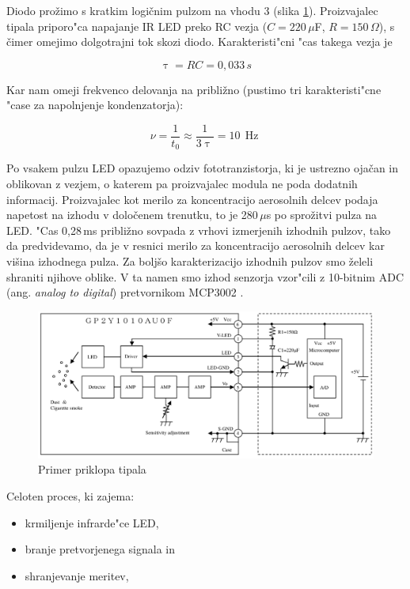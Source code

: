 \documentclass[11pt,a4paper]{article}
\DeclareMathOperator{\Hz}{Hz}
\begin{document}
Diodo prožimo s kratkim logičnim pulzom na vhodu 3 (slika \ref{integration-scheme}). 
Proizvajalec tipala priporo"ca \cite{sharp-gp2y1010au0f} napajanje IR LED preko RC vezja ($C=220\,\mu$F, $R=150\,\Omega$), s čimer omejimo dolgotrajni tok skozi diodo.  
Karakteristi"cni "cas takega vezja je

$$
\uptau = RC = 0,033\,s
$$

Kar nam omeji frekvenco delovanja na približno (pustimo tri karakteristi"cne "case za napolnjenje kondenzatorja):

$$
\nu = \frac{1}{t_0} \approx \frac{1}{3 \uptau} = 10\,\Hz
$$

Po vsakem pulzu LED opazujemo odziv fototranzistorja, ki je ustrezno ojačan in oblikovan z vezjem, o katerem pa proizvajalec modula ne poda dodatnih informacij. Proizvajalec kot merilo za koncentracijo aerosolnih delcev podaja napetost na izhodu v določenem trenutku, to je 280\,$\mu$s po sprožitvi pulza na LED.
 "Cas 0,28\,ms približno sovpada z vrhovi izmerjenih izhodnih pulzov, tako da predvidevamo, da je v resnici merilo za koncentracijo aerosolnih delcev kar višina izhodnega pulza. 
Za boljšo karakterizacijo izhodnih pulzov smo želeli shraniti njihove oblike. V ta namen smo izhod senzorja vzor"cili z 10-bitnim ADC (ang. \textit{analog to digital}) pretvornikom MCP3002 \cite{mcp3002}.


\begin{figure}[H]
	\begin{center}
		\includegraphics[width=12cm]{integration-scheme.png}
		\caption{Primer priklopa tipala}
		\label{integration-scheme}
	\end{center}
\end{figure}

Celoten proces, ki zajema:
\begin{itemize}
	\item krmiljenje infrarde"ce LED,
	\item branje pretvorjenega signala in
	\item shranjevanje meritev,
\end{itemize}
\end{document}
